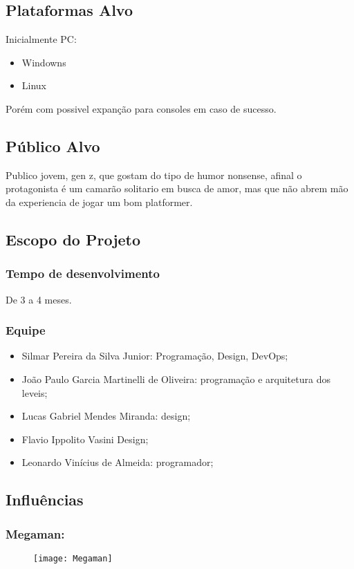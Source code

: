     \subsection{Plataformas Alvo}%
    Inicialmente PC:
        \begin{itemize}
            \item Windowns
            \item Linux
        \end{itemize}
    Porém com possivel expanção para consoles em caso de sucesso.
    \subsection{Público Alvo}%
        Publico jovem, gen z, que gostam do tipo de humor nonsense, afinal o protagonista é um camarão solitario em busca de amor, mas que não abrem mão da experiencia de jogar um bom platformer.

    \subsection{Escopo do Projeto}%
    \subsubsection{Tempo de desenvolvimento}
        De 3 a 4 meses.
    \subsubsection{Equipe}
        \begin{itemize}
            \item Silmar Pereira da Silva Junior: Programação, Design, DevOps;
            \item João Paulo Garcia Martinelli de Oliveira: programação e arquitetura dos leveis;
            \item Lucas Gabriel Mendes Miranda: design;
            \item Flavio Ippolito Vasini Design;
            \item Leonardo Vinícius de Almeida: programador;
        \end{itemize}



    \subsection{Influências}%
        \subsubsection{Megaman:}
        \label{sec:influencias:megaman}
            \begin{figure}[H]
                \texttt{[image: Megaman]}
            \centering
            \end{figure}

